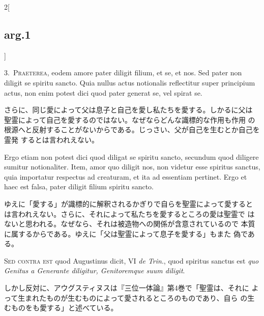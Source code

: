 \documentclass[paper=a4paper,fontsize=10pt,jafontsize=9pt,titlepage]{jlreq}
\begin{document}
\begin{paracol}{2}[\subsection{arg.1}]

3.~{\scshape Praeterea}, eodem amore pater diligit filium, et se, et
 nos. Sed pater non diligit se spiritu sancto. Quia nullus actus
 notionalis reflectitur super principium actus, non enim potest dici
 quod pater generat se, vel spirat se.

\switchcolumn

さらに、同じ愛によって父は息子と自己を愛し私たちを愛する。しかるに父は
 聖霊によって自己を愛するのではない。なぜならどんな識標的な作用も作用
 の根源へと反射することがないからである。じっさい、父が自己を生むとか自己を霊発
 するとは言われえない。

\switchcolumn*

Ergo etiam non potest dici quod
 diligat se spiritu sancto, secundum quod diligere sumitur
 notionaliter. Item, amor quo diligit nos, non videtur esse spiritus
 sanctus, quia importatur respectus ad creaturam, et ita ad essentiam
 pertinet. Ergo et haec est falsa, pater diligit filium spiritu
 sancto.

\switchcolumn

ゆえに「愛する」が識標的に解釈されるかぎりで自らを聖霊によって愛すると
 は言われえない。さらに、それによって私たちを愛するところの愛は聖霊で
 はないと思われる。なぜなら、それは被造物への関係が含意されているので
 本質に属するからである。ゆえに「父は聖霊によって息子を愛する」もまた
 偽である。

\switchcolumn*[\subsection{s.c.}]

{\scshape Sed contra est} quod Augustinus dicit, VI {\itshape de Trin}., quod
 spiritus sanctus est {\itshape quo Genitus a Generante diligitur, Genitoremque
 suum diligit}.

\switchcolumn

しかし反対に、アウグスティヌスは『三位一体論』第4巻で「聖霊は、それに
 よって生まれたものが生むものによって愛されるところのものであり、自ら
 の生むものをも愛する」と述べている。



\end{paracol}
\end{document}
